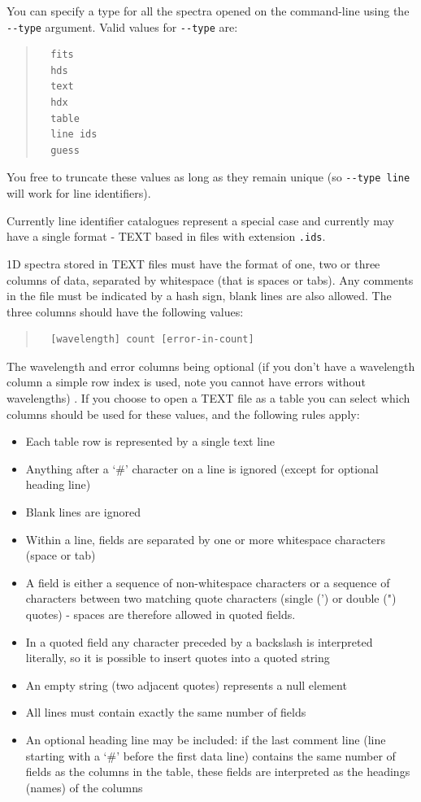 \documentclass[twoside,11pt]{article}
\renewcommand{\_}{\texttt{\symbol{95}}}
\newcommand{\hitext}[1]{\texttt{#1}}
\begin{document}
You can specify a type for all the spectra opened on the command-line using
the
\verb|--type| argument. Valid values for \verb|--type| are:
\begin{quote}
\begin{verbatim}
  fits
  hds
  text
  hdx
  table
  line ids
  guess
\end{verbatim}
\end{quote}
You free to truncate these values as long as they remain unique (so
\verb|--type line| will work for line identifiers).

Currently line identifier catalogues represent a special case and currently
may have a single format - TEXT based in files with extension \hitext{.ids}.

1D spectra stored in TEXT files must have the format of one, two or three
columns of data, separated by whitespace (that is spaces or tabs). Any
comments in the file must be indicated by a hash sign, blank lines are also
allowed. The three columns should have the following values:
\begin{quote}
\begin{verbatim}
  [wavelength] count [error-in-count]
\end{verbatim}
\end{quote}
The wavelength and error columns being optional (if you don't have a
wavelength column a simple row index is used, note you cannot have errors
without wavelengths) . If you choose to open a TEXT file as a table you can
select which columns should be used for these values, and the following rules
apply:
\begin{itemize}
\item Each table row is represented by a single text line
\item Anything after a `\#' character on a line is ignored (except for optional
      heading line)
\item Blank lines are ignored
\item Within a line, fields are separated by one or more whitespace characters
      (space or tab)
\item A field is either a sequence of non-whitespace characters or a sequence
      of characters between two matching quote characters (single (') or double (")
      quotes) - spaces are therefore allowed in quoted fields.
\item In a quoted field any character preceded by a backslash is interpreted
      literally, so it is possible to insert quotes into a quoted string
\item An empty string (two adjacent quotes) represents a null element
\item All lines must contain exactly the same number of fields
\item An optional heading line may be included: if the last comment line (line
      starting with a `\#' before the first data line) contains the same number of
      fields as the columns in the table, these fields are interpreted as the
      headings (names) of the columns
\end{itemize}
\end{document}
